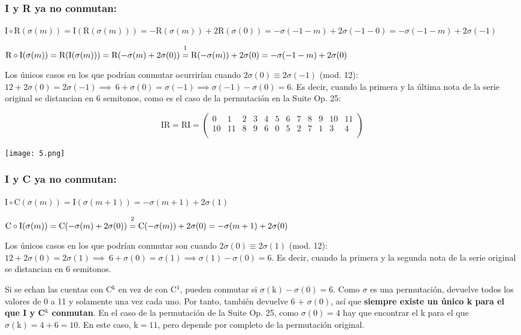 		\subsubsection*{I y R ya no conmutan:}
		
		$\text{I}\circ\text{R}(\sigma(m))=\text{I}(\text{R}(\sigma(m)))=-\text{R}(\sigma(m))+2\text{R}(\sigma(0))=-\sigma(-1-m)+2\sigma(-1-0)=-\sigma(-1-m)+2\sigma(-1)$
		
		$\text{R}\circ\text{I}(\sigma(m))=\text{R}(\text{I}(\sigma(m)))=\text{R}(-\sigma(m)+2\sigma(0))\overset{\footnote{R y T conmutan}}{=}\text{R}(-\sigma(m))+2\sigma(0)=-\sigma(-1-m)+2\sigma(0)$
		
		Los únicos casos en los que podrían conmutar ocurrirían cuando $2\sigma\left(0\right)\equiv2\sigma(-1)$ (mod. 12): $12+2\sigma\left(0\right)=2\sigma\left(-1\right)\implies\ 6+\sigma\left(0\right)=\sigma\left(-1\right)\implies \sigma\left(-1\right)-\sigma\left(0\right)=6$. Es decir, cuando la primera y la última nota de la serie original se distancian en 6 semitonos, como es el caso de la permutación en la Suite Op. 25:
		
		\[
		\text{IR}=\text{RI}=\left(\begin{matrix}0&1&2&3&4&5&6&7&8&9&10&11\\10&11&8&9&6&0&5&2&7&1&3&4\\\end{matrix}\right)
		\]	
		
		\texttt{[image: 5.png]}\\
		
		\subsubsection*{I y C ya no conmutan:}
		
		$\text{I}\circ\text{C}(\sigma(m))=\text{I}(\sigma(m+1))=-\sigma(m+1)+2\sigma(1)$
		
		$\text{C}\circ\text{I}(\sigma(m))=\text{C}(-\sigma(m)+2\sigma(0))\overset{\footnote{C y T conmutan}}{=}\text{C}(-\sigma(m))+2\sigma(0)=-\sigma(m+1)+2\sigma(0)$
		
		Los únicos casos en los que podrían conmutar son cuando $2\sigma\left(0\right)\equiv2\sigma(1)$ (mod. 12): $12+2\sigma\left(0\right)=2\sigma\left(1\right)\implies\ 6+\sigma\left(0\right)=\sigma\left(1\right)\implies \sigma\left(1\right)-\sigma\left(0\right)=6$. Es decir, cuando la primera y la segunda nota de la serie original se distancian en 6 semitonos.
		
		Si se echan las cuentas con C$^\text{k}$ en vez de con C$^1$, pueden conmutar si $\sigma\left(\text{k}\right)-\sigma\left(0\right)=6$. Como $\sigma$ es una permutación, devuelve todos los valores de 0 a 11 y solamente una vez cada uno. Por tanto, también devuelve 6 + $\sigma(0)$, así que \textbf{siempre existe un único k para el que I y C$^\text{k}$ conmutan}. En el caso de la permutación de la Suite Op. 25, como $\sigma\left(0\right)=4$ hay que encontrar el k para el que $\sigma\left(\text{k}\right)=4+6=10$. En este caso, $\text{k}=11$, pero depende por completo de la permutación original.\\
		
